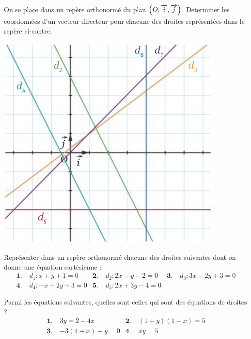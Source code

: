 \documentclass[11pt]{article}
\begin{document}
\begin{exo}~\\
  \begin{minipage}[]{.3\textwidth}
    On se place dans un repère orthonormé du plan $\left( O; \overrightarrow{i}, \overrightarrow{j}
    \right)$. Determiner les coordonnées d'un vecteur directeur pour chacune des
    droites représentées dans le repère ci-contre.
  \end{minipage}
  \begin{minipage}[]{.7\textwidth}
    \begin{center}
      \includegraphics[scale=.7]{exo8.png}
    \end{center}
  \end{minipage}
\end{exo}

\begin{exo}
  Représenter dans un repère orthonormé chacune des droites suivantes dont on
  donne une équation cartésienne :
  \begin{align*}
    \textbf{1.}\; & d_1:x+y+1=0 &
    \textbf{2.}\; & d_2:2x-y-2=0 &
    \textbf{3.}\; & d_3:3x-2y+3=0 \\
    \textbf{4.}\; & d_4:-x+2y+3=0 &
    \textbf{5.}\; & d_5:2x+3y-4=0
  \end{align*}
\end{exo}

\begin{exo}
  Parmi les équations suivantes, quelles sont celles qui sont des équations de
  droites ?
  \begin{align*}
    \textbf{1.}\; & 3y=2-4x &
    \textbf{2.}\; & (1+y)(1-x)=5 \\
    \textbf{3.}\; & -3(1+x)+y=0 & 
    \textbf{4.}\; & xy=5
  \end{align*}
\end{exo}
\end{document}
